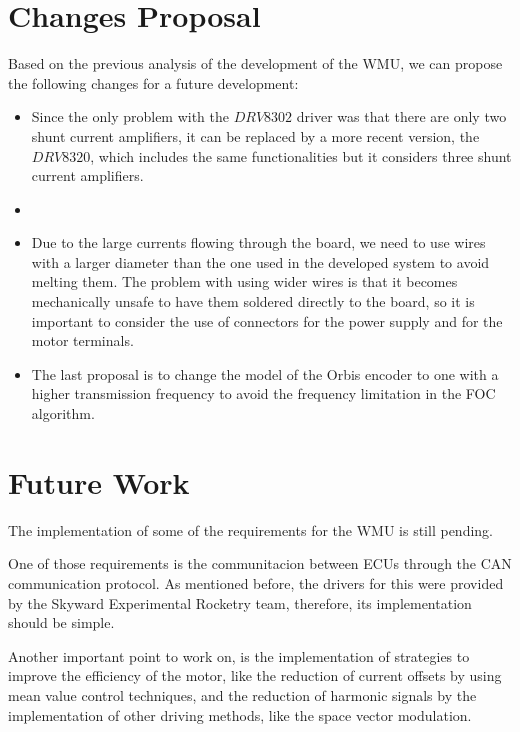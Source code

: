 \section{Changes Proposal}

Based on the previous analysis of the development of the \ac{WMU}, we can propose the following changes for a future development:
\begin{itemize}
	\item Since the only problem with the $DRV8302$ driver was that there are only two shunt current amplifiers, it can be replaced by a more recent version, the $DRV8320$, which includes the same functionalities but it considers three shunt current amplifiers.
	\item 
	\item Due to the large currents flowing through the board, we need to use wires with a larger diameter than the one used in the developed system to avoid melting them. The problem with using wider wires is that it becomes mechanically unsafe to have them soldered directly to the board, so it is important to consider the use of connectors for the power supply and for the motor terminals.
	\item The last proposal is to change the model of the Orbis encoder to one with a higher transmission frequency to avoid the frequency limitation in the \ac{FOC} algorithm.
\end{itemize}

\section{Future Work}

The implementation of some of the requirements for the \ac{WMU} is still pending.

One of those requirements is the communitacion between \ac{ECU}s through the \ac{CAN} communication protocol. As mentioned before, the drivers for this were provided by the Skyward Experimental Rocketry team, therefore, its implementation should be simple.

Another important point to work on, is the implementation of strategies to improve the efficiency of the motor, like the reduction of current offsets by using mean value control techniques, and the reduction of harmonic signals by the implementation of other driving methods, like the space vector modulation.
